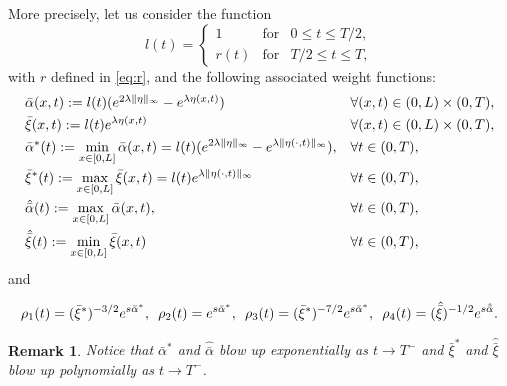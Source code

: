 \documentclass[10pt]{article}
\newtheorem{rmq}{Remark}
\def\dis{\displaystyle}
\def\\Phivec{\mathbf{\Phi}}
\begin{document}
	
	More precisely, let us consider the function
\begin{equation*}
	l(t)=
\left\{
\begin{array}{lll}
	1				&\text{for}& 0  \leq t\leq T/2,\\
	r(t)				&\text{for}& T/2\leq t\leq T,
\end{array}
\right.
\end{equation*}
	with $r$ defined in \eqref{eq:r},
	and the following associated weight functions:
\[
	\begin{array}{ll}
	\bar\alpha(x,t):= l(t) (e^{2\lambda \|\eta \|_\infty} - e^{\lambda\eta (x,t)})&
	\forall (x,t)\in (0,L)\times(0,T),\\
	\noalign{\smallskip}\dis
	\bar\xi(x,t) := l(t) e^{ \lambda\eta (x,t)}&\forall (x,t)\in (0,L)\times(0,T),\\
	\noalign{\smallskip}\dis
	\bar\alpha^*(t):= \min\limits_{x\in [0,L]}\bar\alpha(x,t)=l(t) (e^{2\lambda \|\eta \|_\infty} - e^{\lambda\|\eta (\cdot,t)\|_\infty}),&
	\forall t\in (0,T),\\
	\noalign{\smallskip}\dis
	\bar\xi^*(t) := \max\limits_{x\in [0,L]}\bar\xi(x,t)=l(t) e^{ \lambda \|\eta (\cdot,t)\|_\infty}&\forall t\in (0,T),\\
	\noalign{\smallskip}\dis
	\hat{\bar\alpha}(t):= \max\limits_{x\in [0,L]}\bar\alpha(x,t),&
	\forall t\in (0,T),\\
	\noalign{\smallskip}\dis
		\hat{\bar\xi}(t) := \min\limits_{x\in [0,L]}\bar\xi(x,t)&\forall t\in (0,T),
\end{array}
\]	
	and
\begin{equation*}
\begin{array}{llll}
	\noalign{\smallskip}\dis
	\rho_1(t)=(\bar\xi^*)^{-3/2}e^{s\bar\alpha^*},
	~\, \rho_2(t)= e^{s\bar\alpha^*},
	~\, \rho_3(t)=(\bar\xi^*)^{-7/2}e^{s\bar\alpha^*},
	~\, \rho_4(t)=(\hat{\bar\xi})^{-1/2} e^{s\hat{\bar\alpha}}.
\end{array}
\end{equation*}

\begin{rmq}\label{rmq:infty}
	Notice that $\bar\alpha^*$ and $\hat{\bar\alpha}$ blow up exponentially as $t\to T^-$ and
$\bar\xi^*$ and $\hat{\bar\xi}$  blow up polynomially as $t\to T^-$.
\end{rmq}
\end{document}

